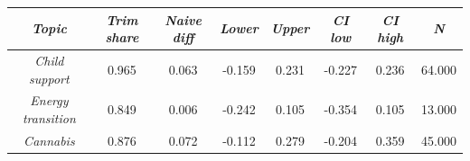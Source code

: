 \begin{tabular}{c c c c c c c c}
      \hline
      \textit{Topic} & \textit{Trim share} & \textit{Naive diff} & \textit{Lower} & \textit{Upper} & \textit{CI low} & \textit{CI high} & \textit{N} \\
      \hline
      \textit{Child support} & 0.965 & 0.063 & -0.159 & 0.231 & -0.227 & 0.236 & 64.000 \\
      \textit{Energy transition} & 0.849 & 0.006 & -0.242 & 0.105 & -0.354 & 0.105 & 13.000 \\
      \textit{Cannabis} & 0.876 & 0.072 & -0.112 & 0.279 & -0.204 & 0.359 & 45.000 \\
      \hline
    \end{tabular}
